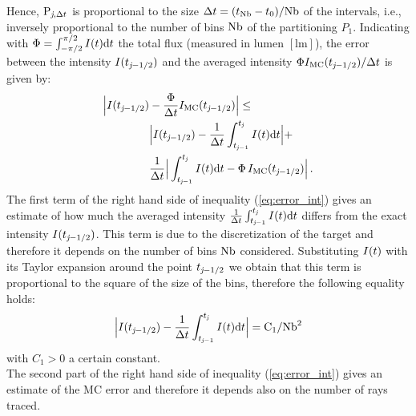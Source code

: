 Hence, $\textrm{P}_{\textit{j}, \Delta t}$ is proportional to the size $\Delta t= (t_{\textrm{Nb}}-t_{0})/{\textrm{Nb}}$
of the intervals, i.e., inversely proportional to the number of bins $\textrm{Nb}$ of the partitioning $P_1$.
Indicating with $\Phi = \int_{-\pi/2}^{\pi/2}I(t) \textrm{d}t$ the total flux (measured in lumen $[\textrm{lm}]$),
the error between the intensity $I(t_{\textit{j}-1/2})$
 and the averaged  intensity $\Phi I_{\textrm{MC}}(t_{\textit{j}-1/2})/\Delta t$ is given by:
\begin{equation}\label{eq:error_int}
\begin{aligned}
\Big|I(t_{\textit{j}-1/2})&-\frac{\Phi}
{\Delta t}I_{\textrm{MC}}(t_{\textit{j}-1/2})\Big| \leq\\
 &\Big|I(t_{\textit{j}-1/2})-\frac{1}{\Delta t}\int_{t_{\textit{j}-1}}^{t_{\textit{j}}} I(t)\textrm{d}t\Big|+\\
&\frac{1}{\Delta t}\Big|\int_{t_{\textit{j}-1}}^{t_{\textit{j}}} I(t)\textrm{d}t-
\Phi\, I_{\textrm{MC}}(t_{\textit{j}-1/2})\Big| \,.
\end{aligned}
\end{equation}
\indent The first term of the right hand side of inequality (\ref{eq:error_int}) gives an estimate of how much the averaged intensity
 $\frac{1}{\Delta t}\int_{t_{\textit{j}-1}}^{t_{\textit{j}}} I(t)\textrm{d}t$ differs from the exact intensity $I(t_{\textit{j}-1/2})$.
This term is due to the discretization of the target and therefore it depends on the number of bins $\textrm{Nb}$ considered.
  Substituting $I(t)$ with its Taylor expansion around the point $t_{\textit{j}-1/2}$ we obtain that this term is proportional to the square of the size of the bins, therefore the following equality holds:
\begin{equation}\Big|I(t_{\textit{j}-1/2})-\frac{1}{\Delta t}\int_{t_{\textit{j}-1}}^{t_{\textit{j}}} I(t)\textrm{d}t\Big| = \textrm{C}_1/\textrm{Nb}^2\end{equation}
with $C_1>0$ a certain constant. \\
\indent
The second part of the right hand side of inequality (\ref{eq:error_int}) gives an estimate of the MC error and therefore it depends also on the
number of rays traced.
